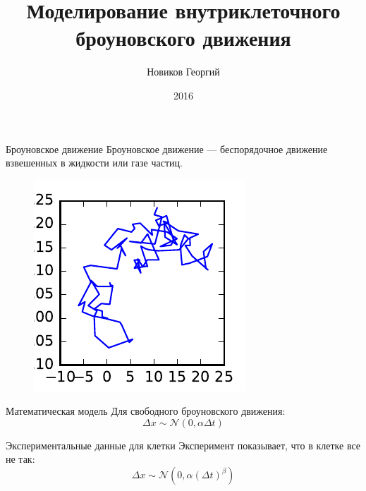 \documentclass[12pt]{beamer}
\title{Моделирование внутриклеточного броуновского движения}
\author{Новиков Георгий}
\institute{Научный руководитель: \\Шпильман Алексей Александрович\\Академический университет}
\date{2016}
\begin{document}
\maketitle

\begin{frame}{Броуновское движение}
	Броуновское движение — беспорядочное движение взвешенных в жидкости или газе частиц. \\
	\begin{figure}
		\centering 
		\includegraphics{br.pdf}
		\label{image2}
	\end{figure}
\end{frame}

\begin{frame}{Математическая модель}
	Для свободного броуновского движения:
	$$\Delta x \sim \mathcal{N}(0, \alpha \Delta t)$$
\end{frame}

\begin{frame}{Экспериментальные данные для клетки}
	Эксперимент показывает, что в клетке все не так:
	$$\Delta x \sim \mathcal{N}(0, \alpha (\Delta t)^\beta)$$
	\begin{figure}
		\centering 
		\label{image2}
	\end{figure}
\end{frame}
\end{document}
